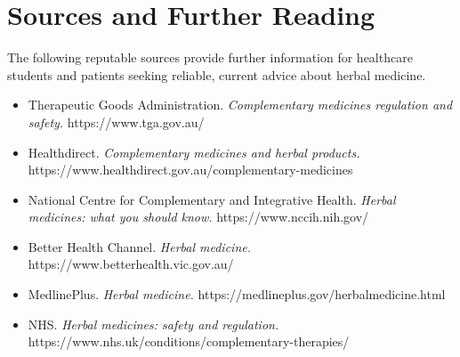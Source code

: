 \section*{Sources and Further Reading}
The following reputable sources provide further information for healthcare students and patients seeking reliable, current advice about herbal medicine.

\begin{itemize}
    \item Therapeutic Goods Administration. \textit{Complementary medicines regulation and safety.} https://www.tga.gov.au/
    \item Healthdirect. \textit{Complementary medicines and herbal products.} https://www.healthdirect.gov.au/complementary-medicines
    \item National Centre for Complementary and Integrative Health. \textit{Herbal medicines: what you should know.} https://www.nccih.nih.gov/
    \item Better Health Channel. \textit{Herbal medicine.} https://www.betterhealth.vic.gov.au/
    \item MedlinePlus. \textit{Herbal medicine.} https://medlineplus.gov/herbalmedicine.html
    \item NHS. \textit{Herbal medicines: safety and regulation.} https://www.nhs.uk/conditions/complementary-therapies/
\end{itemize}
